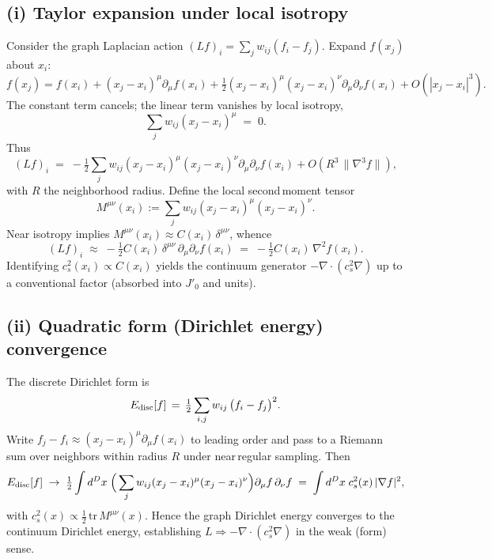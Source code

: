 \documentclass[11pt]{article}
\begin{document}
\subsection*{(i) Taylor expansion under local isotropy}
Consider the graph Laplacian action $(L f)_i = \sum_j w_{ij}(f_i-f_j)$. Expand $f(x_j)$ about $x_i$:
\begin{equation}
  f(x_j) = f(x_i) + (x_j-x_i)^\mu\partial_\mu f(x_i) + \tfrac12 (x_j-x_i)^\mu (x_j-x_i)^\nu \partial_\mu\partial_\nu f(x_i) + O(|x_j-x_i|^3).
\end{equation}
The constant term cancels; the linear term vanishes by local isotropy,
\begin{equation}
  \sum_j w_{ij} (x_j-x_i)^\mu \;=\; 0.
\end{equation}
Thus
\begin{equation}
  (L f)_i \;=\; -\tfrac12 \sum_j w_{ij} (x_j-x_i)^\mu (x_j-x_i)^\nu \partial_\mu\partial_\nu f(x_i) + O(R^3\,\|\nabla^3 f\|),
\end{equation}
with $R$ the neighborhood radius. Define the local second\,moment tensor
\begin{equation}
  M^{\mu\nu}(x_i) := \sum_j w_{ij} (x_j-x_i)^\mu (x_j-x_i)^\nu.
\end{equation}
Near isotropy implies $M^{\mu\nu}(x_i) \approx C(x_i)\,\delta^{\mu\nu}$, whence
\begin{equation}
  (L f)_i \;\approx\; -\tfrac12 C(x_i)\, \delta^{\mu\nu}\, \partial_\mu\partial_\nu f(x_i) \;=\; -\tfrac12 C(x_i)\, \nabla^2 f(x_i).
\end{equation}
Identifying $c_s^2(x_i) \propto C(x_i)$ yields the continuum generator $-\nabla\!\cdot(c_s^2\nabla)$ up to a conventional factor (absorbed into $J'_0$ and units).

\subsection*{(ii) Quadratic form (Dirichlet energy) convergence}
The discrete Dirichlet form is
\begin{equation}
  E_{\rm disc}[f] \,=\, \tfrac12 \sum_{i,j} w_{ij}\, \big(f_i-f_j\big)^2.
\end{equation}
Write $f_j-f_i \approx (x_j-x_i)^\mu \partial_\mu f(x_i)$ to leading order and pass to a Riemann sum over neighbors within radius $R$ under near\,regular sampling. Then
\begin{equation}
  E_{\rm disc}[f] \;\to\; \tfrac12 \int d^D x\; \Big( \sum_j w_{ij} (x_j-x_i)^\mu (x_j-x_i)^\nu \Big) \partial_\mu f\, \partial_\nu f \;=\; \int d^D x\; c_s^2(x)\, |\nabla f|^2,
\end{equation}
with $c_s^2(x) \propto \tfrac12\,\mathrm{tr}\,M^{\mu\nu}(x)$. Hence the graph Dirichlet energy converges to the continuum Dirichlet energy, establishing $L\Rightarrow -\nabla\!\cdot(c_s^2\nabla)$ in the weak (form) sense.
\end{document}

